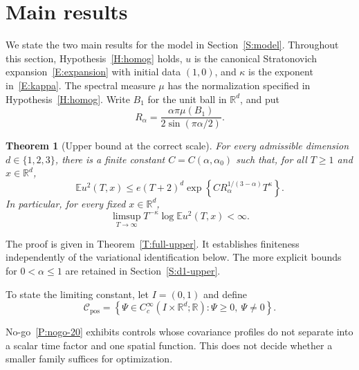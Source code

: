 \documentclass[12pt,oneside,openany]{book}
\numberwithin{equation}{section}
\newtheorem{theorem}{Theorem}[section]
\theoremstyle{nogostyle}
\theoremstyle{definition}
\newcommand{\R}{\mathbb{R}}
\newcommand{\E}{\mathbb{E}}
\begin{document}
\section{Main results}\label{S:targets}

We state the two main results for the model in Section~\ref{S:model}. Throughout
this section, Hypothesis~\ref{H:homog} holds, $u$ is the canonical Stratonovich
expansion~\eqref{E:expansion} with initial data $(1,0)$, and $\kappa$ is the
exponent in~\eqref{E:kappa}. The spectral measure $\mu$ has the normalization
specified in Hypothesis~\ref{H:homog}. Write $B_1$ for the unit ball in
$\R^d$, and put
\begin{equation}\label{E:intro-spectral-mass}
  R_\alpha=\frac{\alpha\pi\mu(B_1)}{2\sin(\pi\alpha/2)}.
\end{equation}

\begin{theorem}[Upper bound at the correct scale]\label{T:intro-upper}
  \label{G:upper}
  For every admissible dimension $d \in \{1,2,3\}$, there is a finite constant
  $C = C(\alpha,\alpha_0)$ such that, for all $T \ge 1$ and $x \in \R^d$,
  \begin{equation}\label{E:intro-upper-bound}
    \E u^2(T,x)
    \le e(T+2)^d
    \exp\left\{C R_\alpha^{1/(3-\alpha)}T^\kappa\right\}.
  \end{equation}
  In particular, for every fixed $x \in \R^d$,
  \[
    \limsup_{T\to\infty}T^{-\kappa}\log\E u^2(T,x)<\infty.
  \]
\end{theorem}

The proof is given in Theorem~\ref{T:full-upper}. It establishes finiteness
independently of the variational identification below. The more explicit bounds
for $0 < \alpha \le 1$ are retained in Section~\ref{S:d1-upper}.

To state the limiting constant, let $I = (0,1)$ and define
\begin{equation}\label{E:intro-control-class}
  \mathcal{C}_{\mathrm{pos}}
  =\left\{\Psi\in C_c^\infty(I\times\R^d;\R):
  \Psi\ge0,\ \Psi\ne0\right\}.
\end{equation}

No-go~\ref{P:nogo-20} exhibits controls whose covariance profiles do not
separate into a scalar time factor and one spatial function. This does not
decide whether a smaller family suffices for optimization.
\end{document}

